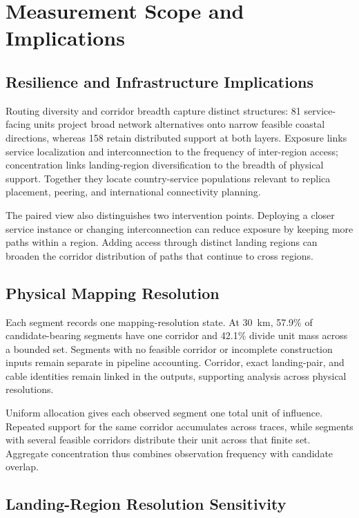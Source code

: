 \section{Measurement Scope and Implications}
\label{sec:scope}

\subsection{Resilience and Infrastructure Implications}
\label{subsec:resilience-implications}

Routing diversity and corridor breadth capture distinct structures: 81
service-facing units project broad network alternatives onto narrow feasible
coastal directions, whereas 158 retain distributed support at both layers.
Exposure links service localization and interconnection to the frequency of
inter-region access; concentration links landing-region diversification to the
breadth of physical support. Together they locate country-service populations
relevant to replica placement, peering, and international connectivity planning.

The paired view also distinguishes two intervention points. Deploying a closer
service instance or changing interconnection can reduce exposure by keeping
more paths within a region. Adding access through distinct landing regions can
broaden the corridor distribution of paths that continue to cross regions.

\subsection{Physical Mapping Resolution}
\label{subsec:mapping-resolution-scope}

Each segment records one mapping-resolution state. At 30~km, 57.9\% of
candidate-bearing segments have one corridor and 42.1\% divide unit mass across
a bounded set. Segments with no feasible corridor or incomplete construction
inputs remain separate in pipeline accounting. Corridor, exact landing-pair,
and cable identities remain linked in the outputs, supporting analysis across
physical resolutions.

Uniform allocation gives each observed segment one total unit of influence.
Repeated support for the same corridor accumulates across traces, while
segments with several feasible corridors distribute their unit across that
finite set. Aggregate concentration thus combines observation frequency with
candidate overlap.

\subsection{Landing-Region Resolution Sensitivity}
\label{subsec:resolution-sensitivity}

